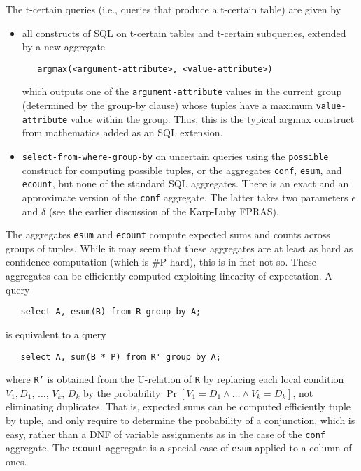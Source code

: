 The t-certain queries (i.e., queries that produce a t-certain table) are given by 
\begin{itemize}
\item
all constructs of SQL on t-certain tables and t-certain subqueries, extended by a new aggregate
\begin{verbatim}
   argmax(<argument-attribute>, <value-attribute>)
\end{verbatim}
which outputs one of the {\tt argument-attribute} values in the current group (determined by the group-by clause) whose tuples have a maximum {\tt value-attribute} value within the group. Thus, this is the typical argmax construct from mathematics added as an SQL extension.

\item
{\tt select-from-where-group-by} on uncertain queries using the {\tt possible} construct for computing possible tuples, or the aggregates {\tt conf}, {\tt esum}, and {\tt ecount}, but none of the standard SQL aggregates. There is an exact and an approximate version of the {\tt conf} aggregate. The
latter takes two parameters $\epsilon$ and $\delta$ (see the earlier discussion of the Karp-Luby FPRAS).
\end{itemize}


The aggregates {\tt esum} and {\tt ecount} compute expected sums and counts across groups of tuples.
While it may seem that these aggregates are at least as hard as confidence computation (which is \#P-hard), this is in fact not so.
These aggregates can be efficiently computed exploiting linearity of expectation.
A query
\begin{verbatim}
   select A, esum(B) from R group by A;
\end{verbatim}
is equivalent to a query
\begin{verbatim}
   select A, sum(B * P) from R' group by A;
\end{verbatim}
where {\tt R'} is obtained from the U-relation of {\tt R} by 
replacing each local condition $V_1, D_1$, $\dots$, $V_k$, $D_k$ by the probability
$\Pr[V_1=D_1 \land \dots \land V_k=D_k]$, not eliminating duplicates.
That is, expected sums can be computed efficiently tuple by tuple, and only require to determine the probability of a conjunction, which is easy, rather than a DNF of variable assignments
as in the case of the {\tt conf} aggregate.
The {\tt ecount} aggregate is a special case of {\tt esum} applied to a column of ones.


